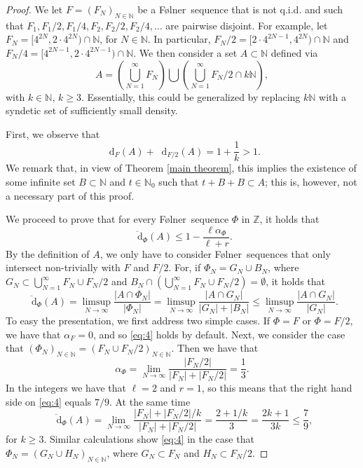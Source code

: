 \documentclass[10pt,a4paper]{amsart}
\newcommand{\Folner}{F\o{}lner}
\def\N{{\mathbb N}}
\def\Z{{\mathbb Z}}
\newcommand*\diff{\mathop{}\!\mathrm{d}}
\begin{document}
\begin{proof}
We let $F=(F_N)_{N\in \N}$ be a \Folner\ sequence that is 
not q.i.d. and such that $F_1,F_1/2,F_1/4,F_2,F_2/2,F_2/4,\ldots$ are pairwise disjoint. For example, let $F_N=[4^{2N},2\cdot 4^{2N})\cap \N$, for 
$N\in \N$. In particular, $F_N/2=[2\cdot 4^{2N-1},4^{2N})\cap \N$ and $F_N/4=[4^{2N-1},2\cdot 4^{2N-1})\cap \N$. We 
then consider a set $A\subset \N$ defined via 
$$A= \left(\bigcup_{N=1}^{\infty} F_N\right) \bigcup \left( \bigcup_{N=1}^{\infty} F_N/2 \cap k\N \right),$$
with $k\in \N$, $k\geq 3$. Essentially, this could 
be generalized by replacing $k\N$ with a syndetic set of 
sufficiently small density. 

First, we observe that 
$$\diff_{F}(A)+\diff_{F/2}(A)=1+\frac{1}{k}>1.$$ 
We remark that, in view of Theorem \ref{main theorem}, this 
implies the existence of some infinite set $B\subset \N$ and 
$t\in \N_0$ such that $t+B+B \subset A$; this is, however, 
not a necessary part of this proof. 

We proceed to prove that for every \Folner\ sequence $\Phi$ 
in 
$\Z$, it holds that 
\begin{equation}\label{eq:4} 
\overline{\diff}_{\Phi}(A) \leq 1-\frac{\ell \alpha_{\Phi}}{\ell+r}.    
\end{equation}
By the definition of $A$, we only have to consider \Folner\ 
sequences that only intersect non-trivially with $F$ and 
$F/2$. For, if $\Phi_N= G_N \cup B_N$, where $G_N \subset \bigcup_{N=1}^{\infty} F_{N}\cup F_{N}/2$ and $B_N\cap \left(\bigcup_{N=1}^{\infty} F_{N}\cup F_{N}/2\right)=\emptyset$, it holds that
$$\overline{\diff}_{\Phi}(A)=\limsup_{N\to \infty} \frac{|A\cap \Phi_N|}{|\Phi_N|}= \limsup_{N\to \infty} \frac{|A\cap G_N|}{|G_N|+|B_N|} \leq \limsup_{N\to \infty} \frac{|A\cap G_N|}{|G_N|}.$$
To easy the presentation, we first address two simple cases.
If $\Phi=F$ or $\Phi=F/2$, we have that $\alpha_{F}=0$, and 
so \eqref{eq:4} holds by default. Next, we consider the case that $(\Phi_N)_{N\in \N}=(F_N\cup F_N/2)_{N\in \N}$. Then we have 
that 
$$\alpha_{\Phi}= \lim_{N\to \infty} 
\frac{|F_N/2|}{|F_N|+|F_N/2|}=\frac{1}{3}.$$
In the integers we have that $\ell=2$ and $r=1$, so this means 
that the right hand side on \eqref{eq:4} equals $7/9$. At the 
same time 
$$\overline{\diff}_{\Phi}(A)=\lim_{N\to \infty} \frac{|F_N|+|F_N/2|/k}{|F_N|+|F_N/2|} = \frac{2+1/k}{3}=\frac{2k+1}{3k} \leq \frac{7}{9}, $$
for $k\geq 3$.
Similar calculations show \eqref{eq:4} in the case that 
$\Phi_N=(G_N \cup H_N)_{N\in \N}$, where $G_N\subset F_N$ and $H_N\subset F_N/2$.


\end{proof}
\end{document}
